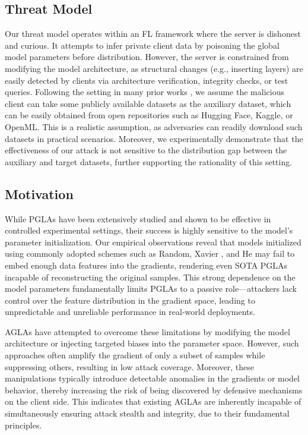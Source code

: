 \subsection{Threat Model}
Our threat model operates within an FL framework where the server is dishonest and curious. It attempts to infer private client data by poisoning the global model parameters before distribution. However, the server is constrained from modifying the model architecture, as structural changes (e.g., inserting layers) are easily detected by clients via architecture verification, integrity checks, or test queries. Following the setting in many prior works \cite{Garov2024Hiding, yang2022using, 285479}, we assume the malicious client can take some publicly available datasets as the auxiliary dataset, which can be easily obtained from open repositories such as Hugging Face\cite{huggingface}, Kaggle\cite{kaggle}, or OpenML\cite{OpenML}. This is a realistic assumption, as adversaries can readily download such datasets in practical scenarios. Moreover, we experimentally demonstrate that the effectiveness of our attack is not sensitive to the distribution gap between the auxiliary and target datasets, further supporting the rationality of this setting.

\subsection{Motivation}
While PGLAs have been extensively studied and shown to be effective in controlled experimental settings, their success is highly sensitive to the model's parameter initialization. Our empirical observations reveal that models initialized using commonly adopted schemes such as Random, Xavier \cite{glorot2010understanding}, and He \cite{he2015delving} may fail to embed enough data features into the gradients, rendering even SOTA PGLAs incapable of reconstructing the original samples. This strong dependence on the model parameters fundamentally limits PGLAs to a passive role—attackers lack control over the feature distribution in the gradient space, leading to unpredictable and unreliable performance in real-world deployments.

AGLAs have attempted to overcome these limitations by modifying the model architecture or injecting targeted biases into the parameter space. However, such approaches often amplify the gradient of only a subset of samples while suppressing others, resulting in low attack coverage. Moreover, these manipulations typically introduce detectable anomalies in the gradients or model behavior, thereby increasing the risk of being discovered by defensive mechanisms on the client side. This indicates that existing AGLAs are inherently incapable of simultaneously ensuring attack stealth and integrity, due to their fundamental principles.

